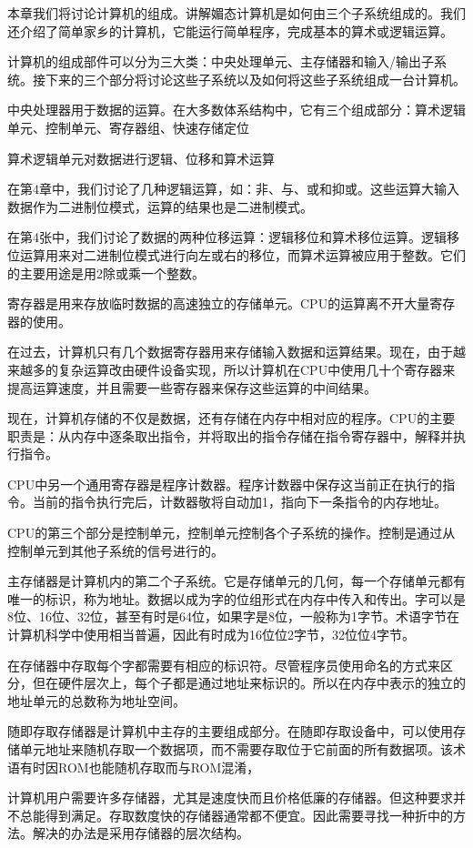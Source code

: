 本章我们将讨论计算机的组成。讲解媚态计算机是如何由三个子系统组成的。我们还介绍了简单家乡的计算机，它能运行简单程序，完成基本的算术或逻辑运算。

计算机的组成部件可以分为三大类：中央处理单元、主存储器和输入/输出子系统。接下来的三个部分将讨论这些子系统以及如何将这些子系统组成一台计算机。

中央处理器用于数据的运算。在大多数体系结构中，它有三个组成部分：算术逻辑单元、控制单元、寄存器组、快速存储定位

算术逻辑单元对数据进行逻辑、位移和算术运算

在第4章中，我们讨论了几种逻辑运算，如：非、与、或和抑或。这些运算大输入数据作为二进制位模式，运算的结果也是二进制模式。

在第4张中，我们讨论了数据的两种位移运算：逻辑移位和算术移位运算。逻辑移位运算用来对二进制位模式进行向左或右的移位，而算术运算被应用于整数。它们的主要用途是用2除或乘一个整数。

寄存器是用来存放临时数据的高速独立的存储单元。CPU的运算离不开大量寄存器的使用。

在过去，计算机只有几个数据寄存器用来存储输入数据和运算结果。现在，由于越来越多的复杂运算改由硬件设备实现，所以计算机在CPU中使用几十个寄存器来提高运算速度，并且需要一些寄存器来保存这些运算的中间结果。

现在，计算机存储的不仅是数据，还有存储在内存中相对应的程序。CPU的主要职责是：从内存中逐条取出指令，并将取出的指令存储在指令寄存器中，解释并执行指令。

CPU中另一个通用寄存器是程序计数器。程序计数器中保存这当前正在执行的指令。当前的指令执行完后，计数器敬将自动加1，指向下一条指令的内存地址。

CPU的第三个部分是控制单元，控制单元控制各个子系统的操作。控制是通过从控制单元到其他子系统的信号进行的。

主存储器是计算机内的第二个子系统。它是存储单元的几何，每一个存储单元都有唯一的标识，称为地址。数据以成为字的位组形式在内存中传入和传出。字可以是8位、16位、32位，甚至有时是64位，如果字是8位，一般称为1字节。术语字节在计算机科学中使用相当普遍，因此有时成为16位位2字节，32位位4字节。

在存储器中存取每个字都需要有相应的标识符。尽管程序员使用命名的方式来区分，但在硬件层次上，每个子都是通过地址来标识的。所以在内存中表示的独立的地址单元的总数称为地址空间。

随即存取存储器是计算机中主存的主要组成部分。在随即存取设备中，可以使用存储单元地址来随机存取一个数据项，而不需要存取位于它前面的所有数据项。该术语有时因ROM也能随机存取而与ROM混淆，

计算机用户需要许多存储器，尤其是速度快而且价格低廉的存储器。但这种要求并不总能得到满足。存取数度快的存储器通常都不便宜。因此需要寻找一种折中的方法。解决的办法是采用存储器的层次结构。
